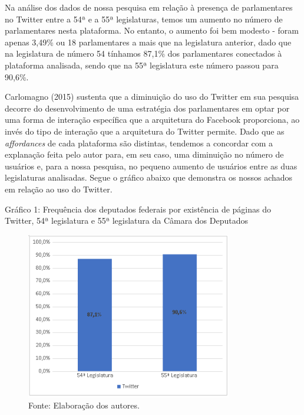Na análise dos dados de nossa pesquisa em relação à presença de
parlamentares no Twitter entre a 54ª e a 55ª legislaturas, temos um
aumento no número de parlamentares nesta plataforma. No entanto, o
aumento foi bem modesto - foram apenas 3,49\% ou 18 parlamentares a mais
que na legislatura anterior, dado que na legislatura de número 54
tínhamos 87,1\% dos parlamentares conectados à plataforma analisada,
sendo que na 55ª legislatura este número passou para 90,6\%.

Carlomagno (2015) sustenta que a diminuição do uso do Twitter em sua
pesquisa decorre do desenvolvimento de uma estratégia dos parlamentares
em optar por uma forma de interação específica que a arquitetura do
Facebook proporciona, ao invés do tipo de interação que a arquitetura do
Twitter permite. Dado que as \emph{affordances} de cada plataforma são
distintas, tendemos a concordar com a explanação feita pelo autor para,
em seu caso, uma diminuição no número de usuários e, para a nossa
pesquisa, no pequeno aumento de usuários entre as duas legislaturas
analisadas. Segue o gráfico abaixo que demonstra os nossos achados em
relação ao uso do Twitter.

\pagebreak

\begin{center}
Gráfico 1: Frequência dos deputados federais por existência de páginas
do Twitter, 54ª legislatura e 55ª legislatura da Câmara dos Deputados
\end{center}

\begin{figure}[!ht]
\centering
 \includegraphics[width=90mm]{./imgs/graf2_1.png}
\caption{Fonte: Elaboração dos autores.}
\end{figure}


